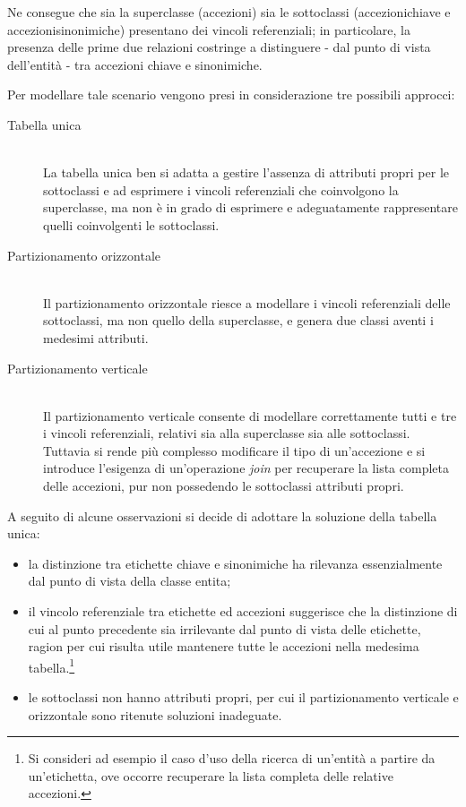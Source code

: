 Ne consegue che sia la superclasse (\textsf{accezioni}) sia le sottoclassi (\textsf{accezioni\textunderscore chiave} e \textsf{accezioni\textunderscore sinonimiche}) presentano dei vincoli referenziali; in particolare, la presenza delle prime due relazioni costringe a distinguere - dal punto di vista dell'entità - tra accezioni chiave e sinonimiche.

Per modellare tale scenario vengono presi in considerazione tre possibili approcci:
\begin{description}
\item[Tabella unica] \hfill \\
La tabella unica ben si adatta a gestire l'assenza di attributi propri per le sottoclassi e ad esprimere i vincoli referenziali che coinvolgono la superclasse, ma non è in grado di esprimere e adeguatamente rappresentare quelli coinvolgenti le sottoclassi.
\item[Partizionamento orizzontale] \hfill \\
Il partizionamento orizzontale riesce a modellare i vincoli referenziali delle sottoclassi, ma non quello della superclasse, e genera due classi aventi i medesimi attributi.
\item[Partizionamento verticale] \hfill \\
Il partizionamento verticale consente di modellare correttamente tutti e tre i vincoli referenziali, relativi sia alla superclasse sia alle sottoclassi. Tuttavia si rende più complesso modificare il tipo di un'accezione e si introduce l'esigenza di un'operazione \textit{join} per recuperare la lista completa delle accezioni, pur non possedendo le sottoclassi attributi propri.
\end{description}

A seguito di alcune osservazioni si decide di adottare la soluzione della tabella unica:
\begin{itemize}
\item la distinzione tra etichette chiave e sinonimiche ha rilevanza essenzialmente dal punto di vista della classe \textsf{entita};
\item il vincolo referenziale tra \textsf{etichette} ed \textsf{accezioni} suggerisce che la distinzione di cui al punto precedente sia irrilevante dal punto di vista delle etichette, ragion per cui risulta utile mantenere tutte le accezioni nella medesima tabella.\footnote{Si consideri ad esempio il caso d'uso della ricerca di un'entità a partire da un'etichetta, ove occorre recuperare la lista completa delle relative accezioni.}
\item le sottoclassi non hanno attributi propri, per cui il partizionamento verticale e orizzontale sono ritenute soluzioni inadeguate.
\end{itemize}


